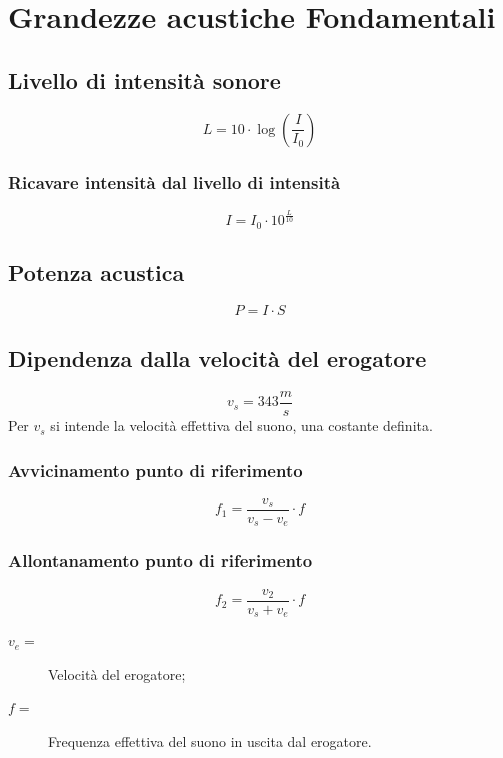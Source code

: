 \documentclass{book}
\begin{document}
\section{Grandezze acustiche Fondamentali}
\label{sec:granacustiche}

\subsection{Livello di intensità sonore}
\label{sec:livintson}

\begin{equation}
  \label{eq:livintson}
  L=10\cdot\log \left(\frac{I}{I_0}\right)
\end{equation}

\subsubsection{Ricavare intensità dal livello di intensità}
\label{sec:ricintdallint}

\begin{equation}
  \label{eq:ricintdallint}
  I=I_0\cdot 10^{\frac{L}{10}}
\end{equation}
\subsection{Potenza acustica}
\label{sec:potacust}

\begin{equation}
  \label{eq:potacust}
  P=I\cdot S
\end{equation}

\subsection{Dipendenza dalla velocità del erogatore}
\label{sec:dipenddalveldeler}
\begin{equation}
  \label{eq:avvidipdalvel}
  v_s=343\frac{m}{s}
\end{equation}
Per $v_s$ si intende la velocità effettiva del suono, una costante definita.
\subsubsection{Avvicinamento punto di riferimento}
\label{sec:avvi}

\begin{equation}
  \label{eq:avvicinamentopuntodiref}
  f_1=\frac{v_s}{v_s-v_e}\cdot f
\end{equation}

\subsubsection{Allontanamento punto di riferimento}
\label{sec:allpuntodirif}

\begin{equation}
  \label{eq:allpuntodiriferimento}
  f_2=\frac{v_2}{v_s+v_e}\cdot f
\end{equation}
\begin{description}
\item[$v_e=$] Velocità del erogatore;
\item[$f=$] Frequenza effettiva del suono in uscita dal erogatore.
\end{description}
\end{document}
